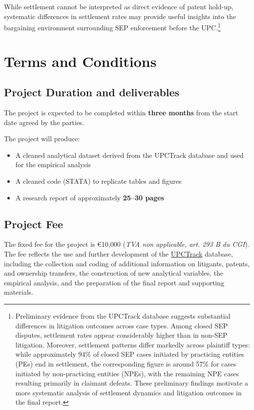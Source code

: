 \documentclass[12pt]{article}
\begin{document}
While settlement cannot be interpreted as direct evidence of patent hold-up, systematic differences in settlement rates may provide useful insights into the bargaining environment surrounding SEP enforcement before the UPC.\footnote{Preliminary evidence from the UPCTrack database suggests substantial differences in litigation outcomes across case types. Among closed SEP disputes, settlement rates appear considerably higher than in non-SEP litigation. Moreover, settlement patterns differ markedly across plaintiff types: while approximately 94\% of closed SEP cases initiated by practicing entities (PEs) end in settlement, the corresponding figure is around 57\% for cases initiated by non-practicing entities (NPEs), with the remaining NPE cases resulting primarily in claimant defeats. These preliminary findings motivate a more systematic analysis of settlement dynamics and litigation outcomes in the final report.}



\section*{Terms and Conditions}

\subsection*{Project Duration and deliverables}

The project is expected to be completed within \textbf{three months} from the start date agreed by the parties.

\vspace{0.5cm}
The project will produce:
\begin{itemize}
\item A cleaned analytical dataset derived from the UPCTrack database and used for the empirical analysis
\item A cleaned code (STATA) to replicate tables and figures
\item A research report of approximately \textbf{25--30 pages} 
\end{itemize}


\subsection*{Project Fee}
The fixed fee for the project is €10,000 (\emph{TVA non applicable, art. 293 B du CGI}).
The fee reflects the use and further development of the \href{https://upcdashboard.wordpress.com/}{UPCTrack} database, including the collection and coding of additional information on litigants, patents, and ownership transfers, the construction of new analytical variables, the empirical analysis, and the preparation of the final report and supporting materials. 
\end{document}
